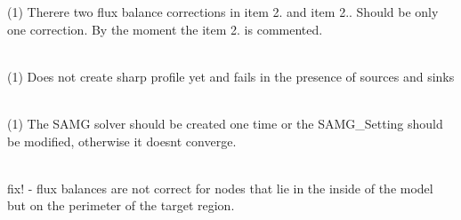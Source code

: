 \begin{DoxyRefList}
\label{todo__todo000101}%
%
(1) There\textquotesingle{}re two flux balance corrections in item 2. and item 2.. Should be only one correction. By the moment the item 2. is commented.  
\item[Member \doxylink{classcsmp_1_1_node_centered_finite_volume_transport_a9a6d9bce8ea7244c580e3970e7031a06}{csmp\+::Node\+Centered\+Finite\+Volume\+Transport\texorpdfstring{$<$}{<} dim \texorpdfstring{$>$}{>}\+::Advect\+Variable2nd\+Order\+In\+Space\+And\+Time} (\doxylink{classcsmp_1_1_node_centered_finite_volume_algorithm}{Node\+Centered\+Finite\+Volume\+Algorithm$<$ dim $>$} \&, double time\+\_\+increment, bool with\+\_\+flux\+\_\+balance\+\_\+correction)]\hfill \\
\label{todo__todo000102}%
%
(1) Does not create sharp profile yet and fails in the presence of sources and sinks  
\item[Member \doxylink{classcsmp_1_1_node_centered_finite_volume_transport_a768228265f4b8e25b542057ae2fd024d}{csmp\+::Node\+Centered\+Finite\+Volume\+Transport\texorpdfstring{$<$}{<} dim \texorpdfstring{$>$}{>}\+::Advect\+Variable\+Single\+Step} (double time\+\_\+increment, bool apply\+\_\+flux\+\_\+balance\+\_\+correction=true, bool update\+\_\+pore\+\_\+volumes=false)]\hfill \\
\label{todo__todo000100}%
%
(1) The SAMG solver should be created one time or the SAMG\+\_\+\+Setting should be modified, otherwise it doesn\textquotesingle{}t converge. 
\item[Member \doxylink{classcsmp_1_1_node_centered_finite_volume_transport_a6c2b1f748d8076da9b4c049538fea632}{csmp\+::Node\+Centered\+Finite\+Volume\+Transport\texorpdfstring{$<$}{<} dim \texorpdfstring{$>$}{>}\+::Update\+Projected\+Velocities\+And\+Flux\+Balances} ()]\hfill \\
\label{todo__todo000098}%
%
fix! -\/ flux balances are not correct for nodes that lie in the inside of the model but on the perimeter of the target region. 
\item[Member \doxylink{classcsmp_1_1_node_manifold_manager_a5fdd0b4480e0a6a6b092dc3bfb64c755}{csmp\+::Node\+Manifold\+Manager\texorpdfstring{$<$}{<} dim \texorpdfstring{$>$}{>}\+::Node\+Manifold\+Manager} (plf\+::colony\texorpdfstring{$<$}{<} \doxylink{classcsmp_1_1_node}{Node$<$ dim $>$} \texorpdfstring{$>$}{>} \&node\+\_\+pointer\+\_\+storage, VData\+::manifold\+Container\+::const\+\_\+iterator first, VData\+::manifold\+Container\+::const\+\_\+iterator last)]\hfill \\

\end{DoxyRefList}
